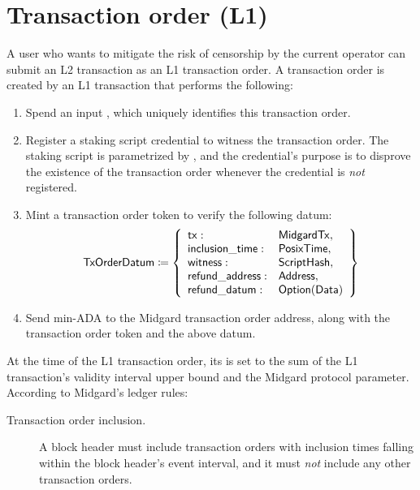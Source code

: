 \documentclass[../midgard.tex]{subfiles}
\begin{document}
\section{Transaction order (L1)}
\label{h:transaction-order}

A user who wants to mitigate the risk of censorship by the current operator can submit an L2 transaction as an L1 transaction order.
A transaction order is created by an L1 transaction that performs the following:
\begin{enumerate}
    \item Spend an input , which uniquely identifies this transaction order.
    \item Register a staking script credential to witness the transaction order.
      The staking script is parametrized by , and the credential's purpose is to disprove the existence of the transaction order whenever the credential is \emph{not} registered.
    \item Mint a transaction order token to verify the following datum:
        \begin{equation*}
        \mathsf{TxOrderDatum} \coloneq \left\{
            \begin{array}{ll}
                \mathsf{tx} : & \mathsf{MidgardTx}, \\
                \mathsf{inclusion\_time} : & \mathsf{PosixTime}, \\
                \mathsf{witness} : & \mathsf{ScriptHash}, \\
                \mathsf{refund\_address}: & \mathsf{Address}, \\
                \mathsf{refund\_datum}: & \mathsf{Option(Data)}
            \end{array}
            \right\}
        \end{equation*}
    \item Send min-ADA to the Midgard transaction order address, along with the transaction order token and the above datum.
\end{enumerate}

At the time of the L1 transaction order, its  is set to the sum of the L1 transaction's validity interval upper bound and the  Midgard protocol parameter.
According to Midgard's ledger rules:
\begin{description}
    \item[Transaction order inclusion.] A block header must include transaction orders with inclusion times falling within the block header's event interval, and it must \emph{not} include any other transaction orders.
\end{description}
\end{document}
